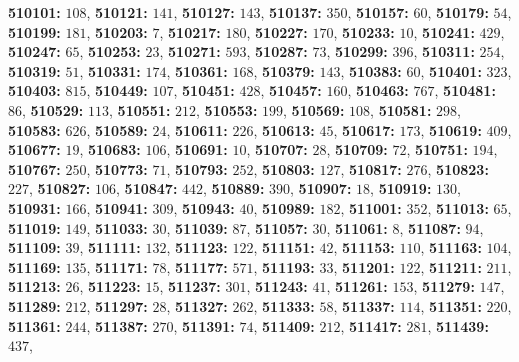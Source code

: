 \textsf{\bfseries 510101:} $108$, \textsf{\bfseries 510121:} $141$, \textsf{\bfseries 510127:} $143$, \textsf{\bfseries 510137:} $350$, \textsf{\bfseries 510157:} $60$, \textsf{\bfseries 510179:} $54$, \textsf{\bfseries 510199:} $181$, \textsf{\bfseries 510203:} $7$, \textsf{\bfseries 510217:} $180$, \textsf{\bfseries 510227:} $170$, \textsf{\bfseries 510233:} $10$, \textsf{\bfseries 510241:} $429$, \textsf{\bfseries 510247:} $65$, \textsf{\bfseries 510253:} $23$, \textsf{\bfseries 510271:} $593$, \textsf{\bfseries 510287:} $73$, \textsf{\bfseries 510299:} $396$, \textsf{\bfseries 510311:} $254$, \textsf{\bfseries 510319:} $51$, \textsf{\bfseries 510331:} $174$, \textsf{\bfseries 510361:} $168$, \textsf{\bfseries 510379:} $143$, \textsf{\bfseries 510383:} $60$, \textsf{\bfseries 510401:} $323$, \textsf{\bfseries 510403:} $815$, \textsf{\bfseries 510449:} $107$, \textsf{\bfseries 510451:} $428$, \textsf{\bfseries 510457:} $160$, \textsf{\bfseries 510463:} $767$, \textsf{\bfseries 510481:} $86$, \textsf{\bfseries 510529:} $113$, \textsf{\bfseries 510551:} $212$, \textsf{\bfseries 510553:} $199$, \textsf{\bfseries 510569:} $108$, \textsf{\bfseries 510581:} $298$, \textsf{\bfseries 510583:} $626$, \textsf{\bfseries 510589:} $24$, \textsf{\bfseries 510611:} $226$, \textsf{\bfseries 510613:} $45$, \textsf{\bfseries 510617:} $173$, \textsf{\bfseries 510619:} $409$, \textsf{\bfseries 510677:} $19$, \textsf{\bfseries 510683:} $106$, \textsf{\bfseries 510691:} $10$, \textsf{\bfseries 510707:} $28$, \textsf{\bfseries 510709:} $72$, \textsf{\bfseries 510751:} $194$, \textsf{\bfseries 510767:} $250$, \textsf{\bfseries 510773:} $71$, \textsf{\bfseries 510793:} $252$, \textsf{\bfseries 510803:} $127$, \textsf{\bfseries 510817:} $276$, \textsf{\bfseries 510823:} $227$, \textsf{\bfseries 510827:} $106$, \textsf{\bfseries 510847:} $442$, \textsf{\bfseries 510889:} $390$, \textsf{\bfseries 510907:} $18$, \textsf{\bfseries 510919:} $130$, \textsf{\bfseries 510931:} $166$, \textsf{\bfseries 510941:} $309$, \textsf{\bfseries 510943:} $40$, \textsf{\bfseries 510989:} $182$, \textsf{\bfseries 511001:} $352$, \textsf{\bfseries 511013:} $65$, \textsf{\bfseries 511019:} $149$, \textsf{\bfseries 511033:} $30$, \textsf{\bfseries 511039:} $87$, \textsf{\bfseries 511057:} $30$, \textsf{\bfseries 511061:} $8$, \textsf{\bfseries 511087:} $94$, \textsf{\bfseries 511109:} $39$, \textsf{\bfseries 511111:} $132$, \textsf{\bfseries 511123:} $122$, \textsf{\bfseries 511151:} $42$, \textsf{\bfseries 511153:} $110$, \textsf{\bfseries 511163:} $104$, \textsf{\bfseries 511169:} $135$, \textsf{\bfseries 511171:} $78$, \textsf{\bfseries 511177:} $571$, \textsf{\bfseries 511193:} $33$, \textsf{\bfseries 511201:} $122$, \textsf{\bfseries 511211:} $211$, \textsf{\bfseries 511213:} $26$, \textsf{\bfseries 511223:} $15$, \textsf{\bfseries 511237:} $301$, \textsf{\bfseries 511243:} $41$, \textsf{\bfseries 511261:} $153$, \textsf{\bfseries 511279:} $147$, \textsf{\bfseries 511289:} $212$, \textsf{\bfseries 511297:} $28$, \textsf{\bfseries 511327:} $262$, \textsf{\bfseries 511333:} $58$, \textsf{\bfseries 511337:} $114$, \textsf{\bfseries 511351:} $220$, \textsf{\bfseries 511361:} $244$, \textsf{\bfseries 511387:} $270$, \textsf{\bfseries 511391:} $74$, \textsf{\bfseries 511409:} $212$, \textsf{\bfseries 511417:} $281$, \textsf{\bfseries 511439:} $437$, 
